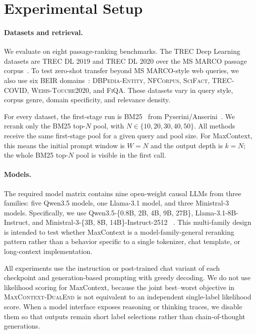 \section{Experimental Setup}
\label{sec:experimental-setup}

\paragraph{Datasets and retrieval.}
We evaluate on eight passage-ranking benchmarks. The TREC Deep Learning
datasets are TREC DL 2019 and TREC DL 2020 over the MS MARCO passage
corpus~\citep{bajaj2016msmarco,craswell2020dl19,craswell2021dl20}. To
test zero-shot transfer beyond MS MARCO-style web queries, we also use
six BEIR domains~\citep{thakur2021beir}: \textsc{DBPedia-Entity},
\textsc{NFCorpus}, \textsc{SciFact}, \textsc{TREC-COVID},
\textsc{Webis-Touche2020}, and \textsc{FiQA}. These datasets vary in
query style, corpus genre, domain specificity, and relevance density.

For every dataset, the first-stage run is BM25~\citep{robertson2009probabilistic}
from Pyserini/Anserini~\citep{lin2021pyserini,yang2017anserini}. We
rerank only the BM25 top-$N$ pool, with
$N \in \{10,20,30,40,50\}$. All methods receive the same first-stage
pool for a given query and pool size. For MaxContext, this means the
initial prompt window is $W=N$ and the output depth is $k=N$; the whole
BM25 top-$N$ pool is visible in the first call.

\paragraph{Models.}
The required model matrix contains nine open-weight causal LLMs from
three families: five Qwen3.5 models, one Llama-3.1 model, and three
Ministral-3 models. Specifically, we use
Qwen3.5-\{0.8B, 2B, 4B, 9B, 27B\}, Llama-3.1-8B-Instruct, and
Ministral-3-\{3B, 8B, 14B\}-Instruct-2512
~\citep{qwen35modelcard,dubey2024llama3,ministral3modelcard}. This
multi-family design is intended to test whether MaxContext is a
model-family-general reranking pattern rather than a behavior specific
to a single tokenizer, chat template, or long-context implementation.

All experiments use the instruction or post-trained chat variant of each
checkpoint and generation-based prompting with greedy decoding. We do not
use likelihood scoring for MaxContext, because the joint best--worst
objective in \textsc{MaxContext-DualEnd} is not equivalent to an
independent single-label likelihood score. When a model interface exposes
reasoning or thinking traces, we disable them so that outputs remain
short label selections rather than chain-of-thought generations.

